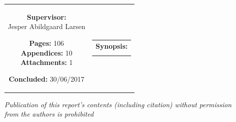 \begin{nopagebreak}
{\begin{tabular}{cc}
{{\textbf{Supervisor:}\\Jesper Abildgaard Larsen\\
}

\textbf{Pages:} 106 \\ 
\textbf{Appendices:} 10 \\
\textbf{Attachments:} 1 \\

\textbf{Concluded:} 30/06/2017\\

\vfill } &
\parbox{7cm}{
  \vspace{.15cm}
  \hfill
  \begin{tabular}{l}
  {\textbf{Synopsis:}} \\
  \fbox{
    \parbox{6.5cm}{\bigskip
     {\vfill{\small 
     \bigskip}}
     }}
   \end{tabular}}
\end{tabular} %
}


\textit{\phantom{A}Publication of this report's contents (including citation) without permission\\ \phantom{A}from the authors is prohibited}\\

\end{nopagebreak}
%